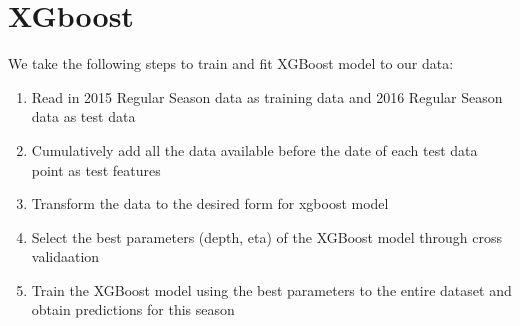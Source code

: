 \section{XGboost}

We take the following steps to train and fit XGBoost model to our data: 
\begin{enumerate}
	\item Read in 2015 Regular Season data as training data and 2016 Regular Season data as test data
	\item Cumulatively add all the data available before the date of each test data point as test features
	\item Transform the data to the desired form for xgboost model
	\item Select the best parameters (depth, eta) of the XGBoost model through cross validaation
	\item Train the XGBoost model using the best parameters to the entire dataset and obtain predictions for this season
\end{enumerate}


